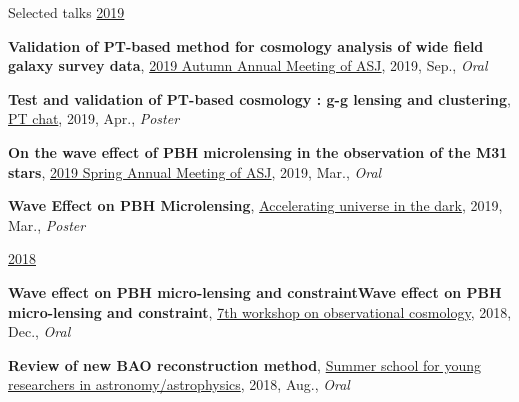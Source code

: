 \begin{rSection}{Selected talks}
\underline{2019}
\begin{etaremune}
\setcounter{enumi}{7}
\item \textbf{Validation of PT-based method for cosmology analysis of wide field galaxy survey data}, \href{https://www.asj.or.jp/nenkai/archive/2019b/pdf/U20a.pdf}{2019 Autumn Annual Meeting of ASJ}, 2019, Sep., \textit{Oral}
\item \textbf{Test and validation of PT-based cosmology : g-g lensing and clustering}, \href{http://pt-chat-kyoto.sciencesconf.org/}{PT chat}, 2019, Apr., \textit{Poster}
\item \textbf{On the wave effect of PBH microlensing in the observation of the M31 stars}, \href{https://www.asj.or.jp/nenkai/archive/2019a/pdf/U14a.pdf}{2019 Spring Annual Meeting of ASJ}, 2019, Mar., \textit{Oral}
\item \textbf{Wave Effect on PBH Microlensing}, \href{http://www2.yukawa.kyoto-u.ac.jp/~aud2019/index.php}{Accelerating universe in the dark}, 2019, Mar., \textit{Poster}
\end{etaremune}

\underline{2018}
\begin{etaremune}
\setcounter{enumi}{3}
\item \textbf{Wave effect on PBH micro-lensing and constraintWave effect on PBH micro-lensing and constraint}, \href{http://web.cc.yamaguchi-u.ac.jp/~rsaito/obscosmo2018/}{7th workshop on observational cosmology}, 2018, Dec., \textit{Oral}
\item \textbf{Review of new BAO reconstruction method}, \href{http://www.astro-wakate.org/ss2018/web/link.html}{Summer school for young researchers in astronomy/astrophysics}, 2018, Aug., \textit{Oral}
\end{etaremune}\end{rSection}

